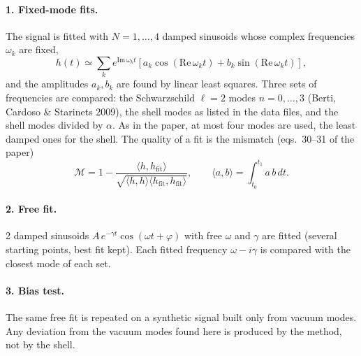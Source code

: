\documentclass[11pt,a4paper]{article}
\begin{document}
\paragraph{1. Fixed-mode fits.} The signal is fitted with $N=1,\dots,4$ damped sinusoids
whose complex frequencies $\omega_k$ are fixed,
\begin{equation}
h(t)\simeq\sum_k e^{\mathrm{Im}\,\omega_k t}\left[a_k\cos(\mathrm{Re}\,\omega_k t)+b_k\sin(\mathrm{Re}\,\omega_k t)\right],
\end{equation}
and the amplitudes $a_k,b_k$ are found by linear least squares. Three sets of frequencies are compared:
the Schwarzschild $\ell=2$ modes $n=0,\dots,3$ (Berti, Cardoso \& Starinets 2009), the shell modes as listed in
the data files, and the shell modes divided by $\alpha$. As in the paper, at most four modes are used, the
least damped ones for the shell. The quality of a fit is the mismatch (eqs.~30--31 of the paper)
\begin{equation}
\mathcal{M}=1-\frac{\langle h,h_\mathrm{fit}\rangle}{\sqrt{\langle h,h\rangle\langle h_\mathrm{fit},h_\mathrm{fit}\rangle}},
\qquad \langle a,b\rangle=\int_{t_0}^{t_1}a\,b\,dt .
\end{equation}

\paragraph{2. Free fit.} 2 damped sinusoids $A\,e^{-\gamma t}\cos(\omega t+\varphi)$ with
free $\omega$ and $\gamma$ are fitted (several starting points, best fit kept). Each fitted frequency
$\omega-i\gamma$ is compared with the closest mode of each set.

\paragraph{3. Bias test.} The same free fit is repeated on a synthetic signal built only from vacuum modes.
Any deviation from the vacuum modes found here is produced by the method, not by the shell.
\end{document}
